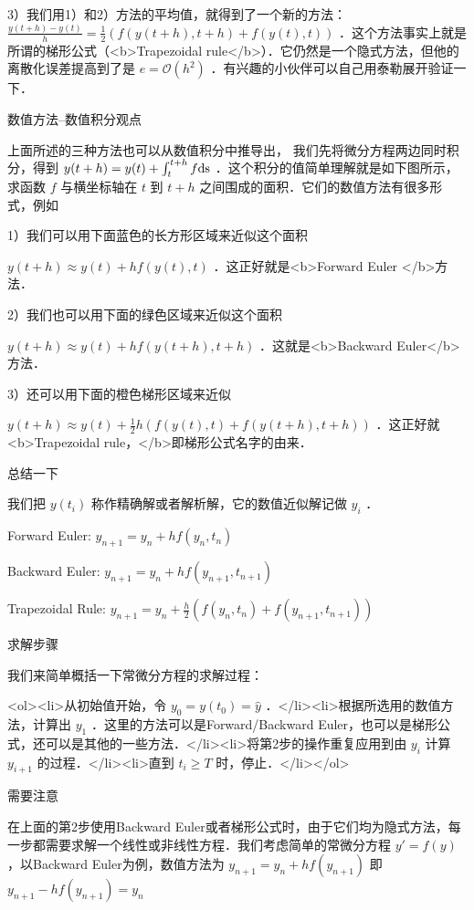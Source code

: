 3）我们用1）和2）方法的平均值，就得到了一个新的方法：  $ \frac{y(t+h)-y(t)}{h}= \frac{1}{2}\left(f(y(t+h),t+h)+f(y(t),t)\right)$  ．这个方法事实上就是所谓的梯形公式（<b>Trapezoidal rule</b>）．它仍然是一个隐式方法，但他的离散化误差提高到了是  $e=\mathcal{O}(h^2)$ ．有兴趣的小伙伴可以自己用泰勒展开验证一下．



数值方法--数值积分观点

上面所述的三种方法也可以从数值积分中推导出， 我们先将微分方程两边同时积分，得到  $y(t+h)=y(t)+\int_t^{t+h}f \rm{d}s$  ．这个积分的值简单理解就是如下图所示，求函数  $f$  与横坐标轴在  $t$  到  $t+h$  之间围成的面积．它们的数值方法有很多形式，例如

1）我们可以用下面蓝色的长方形区域来近似这个面积

$y(t+h)\approx y(t)+hf(y(t),t)$  ．这正好就是<b>Forward Euler </b>方法．

2）我们也可以用下面的绿色区域来近似这个面积

$y(t+h)\approx y(t)+hf(y(t+h),t+h)$  ．这就是<b>Backward Euler</b>方法．

3）还可以用下面的橙色梯形区域来近似

$y(t+h)\approx y(t)+\frac{1}{2}h\left(f(y(t),t)+f(y(t+h),t+h)\right)$  ．这正好就<b>Trapezoidal rule，</b>即梯形公式名字的由来．


总结一下

我们把  $y(t_i)$  称作精确解或者解析解，它的数值近似解记做  $y_i$ ．

Forward Euler:  $y_{n+1}=y_n+hf(y_n,t_n)$  

Backward Euler:  $y_{n+1}=y_n+hf(y_{n+1},t_{n+1})$  

Trapezoidal Rule:  $y_{n+1}=y_n+\frac{h}{2}\left(f(y_n,t_n)+f(y_{n+1},t_{n+1}) \right)$  



求解步骤

我们来简单概括一下常微分方程的求解过程：

<ol><li>从初始值开始，令  $y_0=y(t_0)=\hat{y}$  ．</li><li>根据所选用的数值方法，计算出  $y_1$  ．这里的方法可以是Forward/Backward Euler，也可以是梯形公式，还可以是其他的一些方法．</li><li>将第2步的操作重复应用到由  $y_i$  计算  $y_{i+1}$  的过程．</li><li>直到  $t_i\ge T$  时，停止．</li></ol>

需要注意

在上面的第2步使用Backward Euler或者梯形公式时，由于它们均为隐式方法，每一步都需要求解一个线性或非线性方程．我们考虑简单的常微分方程  $y'=f(y)$  ，以Backward Euler为例，数值方法为 $y_{n+1}=y_{n}+hf(y_{n+1})$  即  $y_{n+1}-hf(y_{n+1})=y_{n}$  

